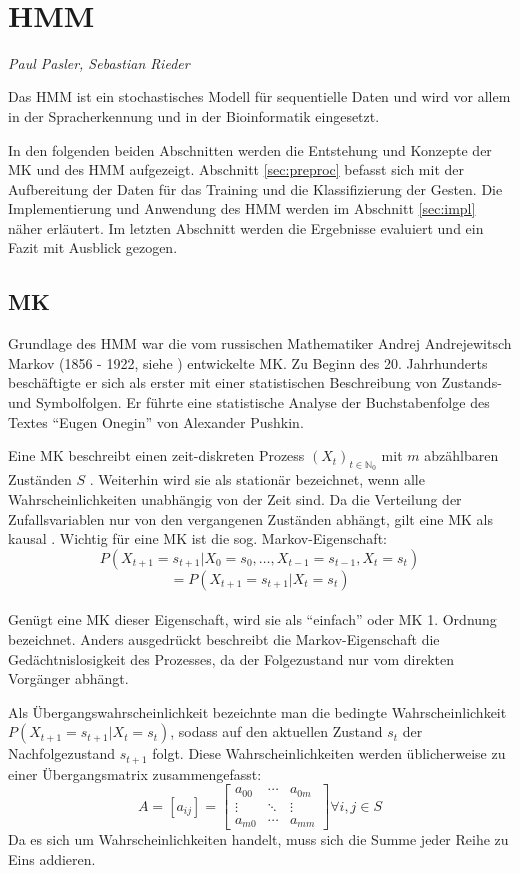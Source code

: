 ﻿﻿\section{\acl{HMM}}
\label{mainsec:hmm}
\textit{Paul Pasler, Sebastian Rieder}

Das \acl{HMM} ist ein stochastisches Modell für sequentielle Daten und wird vor allem in der Spracherkennung und in der Bioinformatik eingesetzt.

In den folgenden beiden Abschnitten werden die Entstehung und Konzepte der \acl{MK} und des \acl{HMM} aufgezeigt.
Abschnitt \ref{sec:preproc} befasst sich mit der Aufbereitung der Daten für das Training und die Klassifizierung der Gesten.
Die Implementierung und Anwendung des \acl{HMM} werden im Abschnitt \ref{sec:impl} näher erläutert. Im letzten Abschnitt werden die Ergebnisse 
evaluiert und ein Fazit mit Ausblick gezogen.  
 
\subsection{\acl{MK}} \label{sec:chain}
Grundlage des \acl{HMM} war die vom russischen Mathematiker Andrej Andrejewitsch Markov 
(1856 - 1922, siehe \cite{markov1913}) entwickelte \acl{MK}. Zu Beginn des
20. Jahrhunderts beschäftigte er sich als erster mit einer statistischen Beschreibung von Zustands- und Symbolfolgen. 
Er führte eine statistische Analyse der Buchstabenfolge des Textes ``Eugen Onegin'' von Alexander 
Pushkin.

Eine \acl{MK} beschreibt einen zeit-diskreten Prozess \((X_t)_{t\in\mathbb{N}_0}\) mit  \(m\) abzählbaren Zuständen \(S\) \cite{stochMod}.
Weiterhin wird sie als stationär bezeichnet, wenn alle Wahrscheinlichkeiten unabhängig von der Zeit sind.
Da die Verteilung der Zufallsvariablen nur von den vergangenen Zuständen abhängt, gilt eine \acl{MK} als kausal \cite[48]{mmmFink}.
Wichtig für eine \acl{MK} ist die sog. Markov-Eigenschaft:
\[ P (X_{t+1} = s_{t+1} | X_0 = s_0, \ldots , X_{t-1} = s_{t-1}, X_{t} = s_{t}) \]
\[ = P ( X_{t+1} = s_{t+1} | X_{t} = s_{t} ) \] \\
Genügt eine \acl{MK} dieser Eigenschaft, wird sie als ``einfach'' oder \acl{MK} 1. Ordnung bezeichnet.
Anders ausgedrückt beschreibt die Markov-Eigenschaft die Gedächtnislosigkeit des Prozesses, da der Folgezustand nur vom direkten Vorgänger abhängt.

Als Übergangswahrscheinlichkeit bezeichnte man die bedingte Wahrscheinlichkeit \(P ( X_{t+1} = s_{t+1} | X_{t} = s_{t} ) \), sodass auf 
den aktuellen Zustand \( s_{t}\) der Nachfolgezustand \( s_{t+1}\) folgt. Diese Wahrscheinlichkeiten werden üblicherweise zu einer Übergangsmatrix zusammengefasst: 
\[ A = [a_{ij}] =
\begin {bmatrix} 
  a_{00}&\cdots&a_{0m} \\
  \vdots&\ddots&\vdots \\
  a_{m0}&\cdots&a_{mm}
 \end {bmatrix} \forall i, j \in S \]
Da es sich um Wahrscheinlichkeiten handelt, muss sich die Summe jeder Reihe zu Eins addieren. \\

